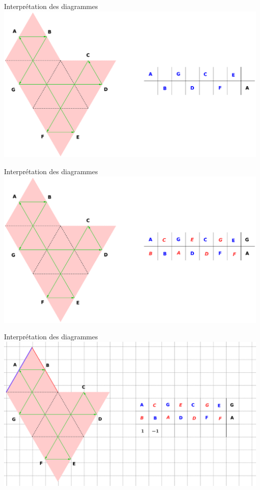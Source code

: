 \documentclass[french,xcolor=dvipsnames]{beamer}
\begin{document}
		\begin{frame}{Interprétation des diagrammes}
			\includegraphics[scale=0.1]{conversion_tuckey_patron_2.eps}
		\end{frame}

		\begin{frame}{Interprétation des diagrammes}
			\includegraphics[scale=0.1]{conversion_tuckey_patron_3.eps}
		\end{frame}
		
		\begin{frame}{Interprétation des diagrammes}
			\includegraphics[scale=0.1]{conversion_tuckey_patron_4.eps}
		\end{frame}
		
\end{document}
